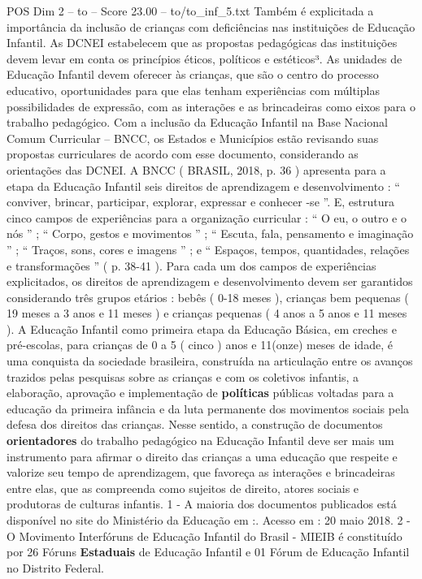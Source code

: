 \begin{textsample}{POS Dim 2 – to – Score 23.00 – to/to\_inf\_5.txt}
Também é explicitada a importância da inclusão de crianças com deficiências nas instituições de Educação Infantil.
As DCNEI estabelecem que as propostas pedagógicas das instituições devem levar em conta os princípios éticos, políticos e estéticos³.
As unidades de Educação Infantil devem oferecer às crianças, que são o centro do processo educativo, oportunidades para que elas tenham experiências com múltiplas possibilidades de expressão, com as interações e as brincadeiras como eixos para o trabalho pedagógico.
Com a inclusão da Educação Infantil na Base Nacional Comum Curricular – BNCC, os Estados e Municípios estão revisando suas propostas curriculares de acordo com esse documento, considerando as orientações das DCNEI.
A BNCC ( BRASIL, 2018, p. 36 ) apresenta para a etapa da Educação Infantil seis direitos de aprendizagem e desenvolvimento : “ conviver, brincar, participar, explorar, expressar e conhecer -se ”.
E, estrutura cinco campos de experiências para a organização curricular : “ O eu, o outro e o nós ” ; “ Corpo, gestos e movimentos ” ; “ Escuta, fala, pensamento e imaginação ” ; “ Traços, sons, cores e imagens ” ; e “ Espaços, tempos, quantidades, relações e transformações ” ( p. 38-41 ).
Para cada um dos campos de experiências explicitados, os direitos de aprendizagem e desenvolvimento devem ser garantidos considerando três grupos etários : bebês ( 0-18 meses ), crianças bem pequenas ( 19 meses a 3 anos e 11 meses ) e crianças pequenas ( 4 anos a 5 anos e 11 meses ).
A Educação Infantil como primeira etapa da Educação Básica, em creches e pré-escolas, para crianças de 0 a 5 ( cinco ) anos e 11(onze) meses de idade, é uma conquista da sociedade brasileira, construída na articulação entre os avanços trazidos pelas pesquisas sobre as crianças e com os coletivos infantis, a elaboração, aprovação e implementação de \textbf{políticas} públicas voltadas para a educação da primeira infância e da luta permanente dos movimentos sociais pela defesa dos direitos das crianças.
Nesse sentido, a construção de documentos \textbf{orientadores} do trabalho pedagógico na Educação Infantil deve ser mais um instrumento para afirmar o direito das crianças a uma educação que respeite e valorize seu tempo de aprendizagem, que favoreça as interações e brincadeiras entre elas, que as compreenda como sujeitos de direito, atores sociais e produtoras de culturas infantis. 1 - A maioria dos documentos publicados está disponível no site do Ministério da Educação em :.
Acesso em : 20 maio 2018. 2 - O Movimento Interfóruns de Educação Infantil do Brasil - MIEIB é constituído por 26 Fóruns \textbf{Estaduais} de Educação Infantil e 01 Fórum de Educação Infantil no Distrito Federal.

\end{textsample}
